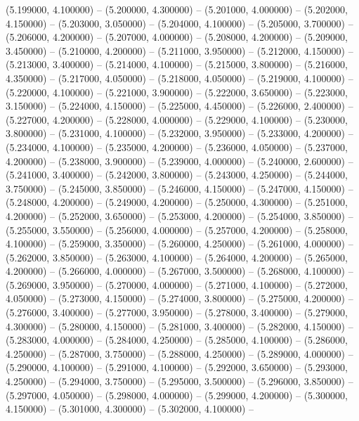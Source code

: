 (5.199000, 4.100000) -- 
(5.200000, 4.300000) -- 
(5.201000, 4.000000) -- 
(5.202000, 4.150000) -- 
(5.203000, 3.050000) -- 
(5.204000, 4.100000) -- 
(5.205000, 3.700000) -- 
(5.206000, 4.200000) -- 
(5.207000, 4.000000) -- 
(5.208000, 4.200000) -- 
(5.209000, 3.450000) -- 
(5.210000, 4.200000) -- 
(5.211000, 3.950000) -- 
(5.212000, 4.150000) -- 
(5.213000, 3.400000) -- 
(5.214000, 4.100000) -- 
(5.215000, 3.800000) -- 
(5.216000, 4.350000) -- 
(5.217000, 4.050000) -- 
(5.218000, 4.050000) -- 
(5.219000, 4.100000) -- 
(5.220000, 4.100000) -- 
(5.221000, 3.900000) -- 
(5.222000, 3.650000) -- 
(5.223000, 3.150000) -- 
(5.224000, 4.150000) -- 
(5.225000, 4.450000) -- 
(5.226000, 2.400000) -- 
(5.227000, 4.200000) -- 
(5.228000, 4.000000) -- 
(5.229000, 4.100000) -- 
(5.230000, 3.800000) -- 
(5.231000, 4.100000) -- 
(5.232000, 3.950000) -- 
(5.233000, 4.200000) -- 
(5.234000, 4.100000) -- 
(5.235000, 4.200000) -- 
(5.236000, 4.050000) -- 
(5.237000, 4.200000) -- 
(5.238000, 3.900000) -- 
(5.239000, 4.000000) -- 
(5.240000, 2.600000) -- 
(5.241000, 3.400000) -- 
(5.242000, 3.800000) -- 
(5.243000, 4.250000) -- 
(5.244000, 3.750000) -- 
(5.245000, 3.850000) -- 
(5.246000, 4.150000) -- 
(5.247000, 4.150000) -- 
(5.248000, 4.200000) -- 
(5.249000, 4.200000) -- 
(5.250000, 4.300000) -- 
(5.251000, 4.200000) -- 
(5.252000, 3.650000) -- 
(5.253000, 4.200000) -- 
(5.254000, 3.850000) -- 
(5.255000, 3.550000) -- 
(5.256000, 4.000000) -- 
(5.257000, 4.200000) -- 
(5.258000, 4.100000) -- 
(5.259000, 3.350000) -- 
(5.260000, 4.250000) -- 
(5.261000, 4.000000) -- 
(5.262000, 3.850000) -- 
(5.263000, 4.100000) -- 
(5.264000, 4.200000) -- 
(5.265000, 4.200000) -- 
(5.266000, 4.000000) -- 
(5.267000, 3.500000) -- 
(5.268000, 4.100000) -- 
(5.269000, 3.950000) -- 
(5.270000, 4.000000) -- 
(5.271000, 4.100000) -- 
(5.272000, 4.050000) -- 
(5.273000, 4.150000) -- 
(5.274000, 3.800000) -- 
(5.275000, 4.200000) -- 
(5.276000, 3.400000) -- 
(5.277000, 3.950000) -- 
(5.278000, 3.400000) -- 
(5.279000, 4.300000) -- 
(5.280000, 4.150000) -- 
(5.281000, 3.400000) -- 
(5.282000, 4.150000) -- 
(5.283000, 4.000000) -- 
(5.284000, 4.250000) -- 
(5.285000, 4.100000) -- 
(5.286000, 4.250000) -- 
(5.287000, 3.750000) -- 
(5.288000, 4.250000) -- 
(5.289000, 4.000000) -- 
(5.290000, 4.100000) -- 
(5.291000, 4.100000) -- 
(5.292000, 3.650000) -- 
(5.293000, 4.250000) -- 
(5.294000, 3.750000) -- 
(5.295000, 3.500000) -- 
(5.296000, 3.850000) -- 
(5.297000, 4.050000) -- 
(5.298000, 4.000000) -- 
(5.299000, 4.200000) -- 
(5.300000, 4.150000) -- 
(5.301000, 4.300000) -- 
(5.302000, 4.100000) -- 

